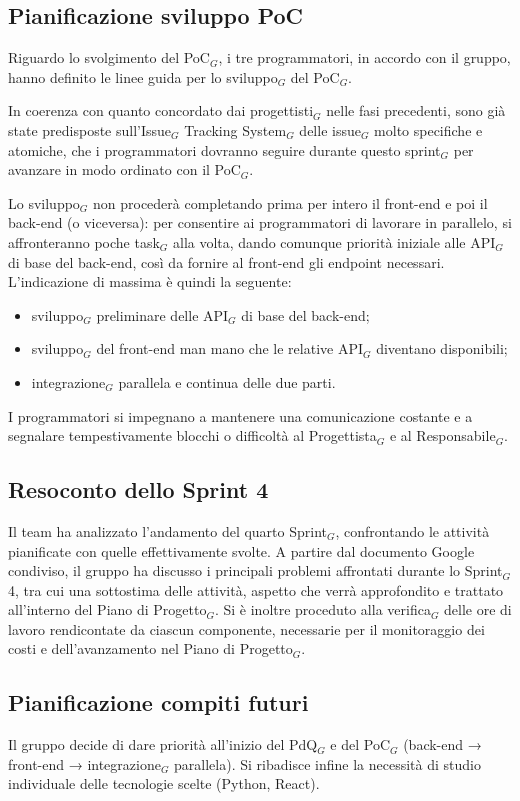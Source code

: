 \documentclass[a4paper, 10pt, colorlinks=true, linkcolor=black, urlcolor=blue, citecolor=blue, hidelinks]{article}
\begin{document}
\subsection{Pianificazione sviluppo PoC}
Riguardo lo svolgimento del PoC$_G$, i tre programmatori, in accordo con il gruppo, hanno definito le linee guida per lo sviluppo$_G$ del PoC$_G$.

In coerenza con quanto concordato dai progettisti$_G$ nelle fasi precedenti, sono già state predisposte sull'Issue$_G$ Tracking System$_G$ delle issue$_G$ molto specifiche e atomiche, che i programmatori dovranno seguire durante questo sprint$_G$ per avanzare in modo ordinato con il PoC$_G$.

Lo sviluppo$_G$ non procederà completando prima per intero il front-end e poi il back-end (o viceversa): per consentire ai programmatori di lavorare in parallelo, si affronteranno poche task$_G$ alla volta, dando comunque priorità iniziale alle API$_G$ di base del back-end, così da fornire al front-end gli endpoint necessari. L'indicazione di massima è quindi la seguente:
\begin{itemize}
    \item sviluppo$_G$ preliminare delle API$_G$ di base del back-end;
    \item sviluppo$_G$ del front-end man mano che le relative API$_G$ diventano disponibili;
    \item integrazione$_G$ parallela e continua delle due parti.
\end{itemize}
I programmatori si impegnano a mantenere una comunicazione costante e a segnalare tempestivamente blocchi o difficoltà al Progettista$_G$ e al Responsabile$_G$.

\subsection{Resoconto dello Sprint 4}
Il team ha analizzato l'andamento del quarto Sprint$_G$, confrontando le attività pianificate con quelle effettivamente svolte. A partire dal documento Google condiviso, il gruppo ha discusso i principali problemi affrontati durante lo Sprint$_G$ 4, tra cui una sottostima delle attività, aspetto che verrà approfondito e trattato all'interno del Piano di Progetto$_G$. Si è inoltre proceduto alla verifica$_G$ delle ore di lavoro rendicontate da ciascun componente, necessarie per il monitoraggio dei costi e dell'avanzamento nel Piano di Progetto$_G$.

\subsection{Pianificazione compiti futuri}
Il gruppo decide di dare priorità all'inizio del PdQ$_G$ e del PoC$_G$ (back-end → front-end → integrazione$_G$ parallela). Si ribadisce infine la necessità di studio individuale delle tecnologie scelte (Python, React).
\end{document}
